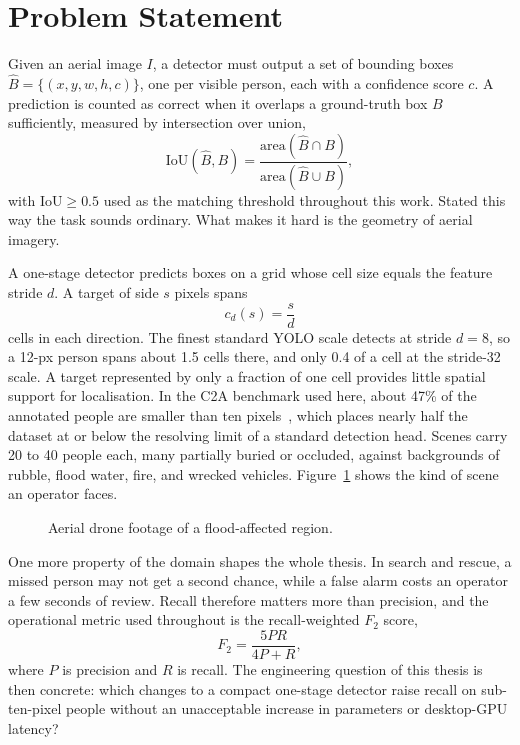 \section{Problem Statement}
Given an aerial image $I$, a detector must output a set of bounding boxes
$\hat{B} = \{(x, y, w, h, c)\}$, one per visible person, each with a confidence
score $c$. A prediction is counted as correct when it overlaps a ground-truth
box $B$ sufficiently, measured by intersection over union,
\begin{equation}
  \mathrm{IoU}(\hat{B}, B) =
    \frac{\mathrm{area}(\hat{B} \cap B)}{\mathrm{area}(\hat{B} \cup B)},
  \label{eq:iou}
\end{equation}
with $\mathrm{IoU} \geq 0.5$ used as the matching threshold throughout this
work. Stated this way the task sounds ordinary. What makes it hard is the
geometry of aerial imagery.

A one-stage detector predicts boxes on a grid whose cell size equals the
feature stride $d$. A target of side $s$ pixels spans
\begin{equation}
  c_d(s) = \frac{s}{d}
  \label{eq:coverage}
\end{equation}
cells in each direction. The finest standard YOLO scale detects at stride
$d = 8$, so a 12-px person spans about 1.5 cells there, and only 0.4 of a cell
at the stride-32 scale. A target represented by only a fraction of one cell
provides little spatial support for localisation. In the C2A benchmark used here, about 47\% of the
annotated people are smaller than ten pixels~\cite{nihal2024c2a}, which places
nearly half the dataset at or below the resolving limit of a standard
detection head. Scenes carry 20 to 40 people each, many partially buried or
occluded, against backgrounds of rubble, flood water, fire, and wrecked
vehicles. Figure~\ref{fig:introscene} shows the kind of scene an operator
faces.

\begin{figure}[tbp]
  \centering
  \caption{Aerial drone footage of a flood-affected region.}
  \label{fig:introscene}
\end{figure}

One more property of the domain shapes the whole thesis. In search and rescue,
a missed person may not get a second chance, while a false alarm costs an
operator a few seconds of review. Recall therefore matters more than
precision, and the operational metric used throughout is the recall-weighted
$F_2$ score,
\begin{equation}
  F_2 = \frac{5PR}{4P + R},
  \label{eq:f2}
\end{equation}
where $P$ is precision and $R$ is recall. The engineering question of this
thesis is then concrete: which changes to a compact one-stage detector raise
recall on sub-ten-pixel people without an unacceptable increase in parameters
or desktop-GPU latency?

